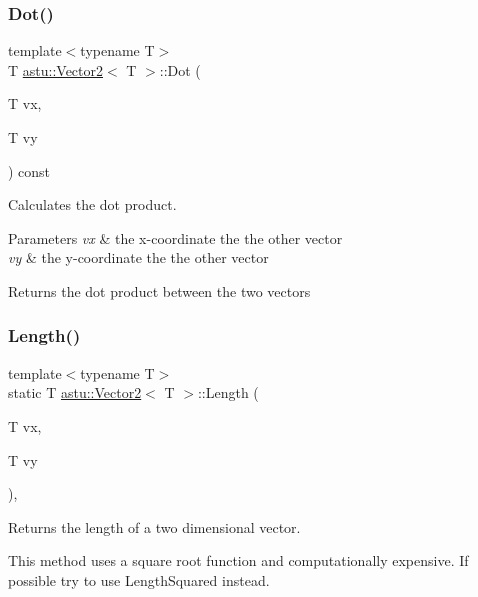 \subsubsection{\texorpdfstring{Dot()}{Dot()}\hspace{0.1cm}{\footnotesize\ttfamily [2/2]}}
{\footnotesize\ttfamily template$<$typename T$>$ \\
T \hyperlink{classastu_1_1Vector2}{astu\+::\+Vector2}$<$ T $>$\+::Dot (\begin{DoxyParamCaption}\item[{T}]{vx,  }\item[{T}]{vy }\end{DoxyParamCaption}) const\hspace{0.3cm}{\ttfamily [inline]}}

Calculates the dot product.


\begin{DoxyParams}{Parameters}
{\em vx} & the x-\/coordinate the the other vector \\
\hline
{\em vy} & the y-\/coordinate the the other vector \\
\hline
\end{DoxyParams}
\begin{DoxyReturn}{Returns}
the dot product between the two vectors 
\end{DoxyReturn}
\mbox{\label{classastu_1_1Vector2_a7fdf839b6c3444121dc6fb2eb88c200e}} 
\subsubsection{\texorpdfstring{Length()}{Length()}\hspace{0.1cm}{\footnotesize\ttfamily [1/2]}}
{\footnotesize\ttfamily template$<$typename T$>$ \\
static T \hyperlink{classastu_1_1Vector2}{astu\+::\+Vector2}$<$ T $>$\+::Length (\begin{DoxyParamCaption}\item[{T}]{vx,  }\item[{T}]{vy }\end{DoxyParamCaption})\hspace{0.3cm}{\ttfamily [inline]}, {\ttfamily [static]}}

Returns the length of a two dimensional vector.

This method uses a square root function and computationally expensive. If possible try to use {\ttfamily Length\+Squared} instead.


